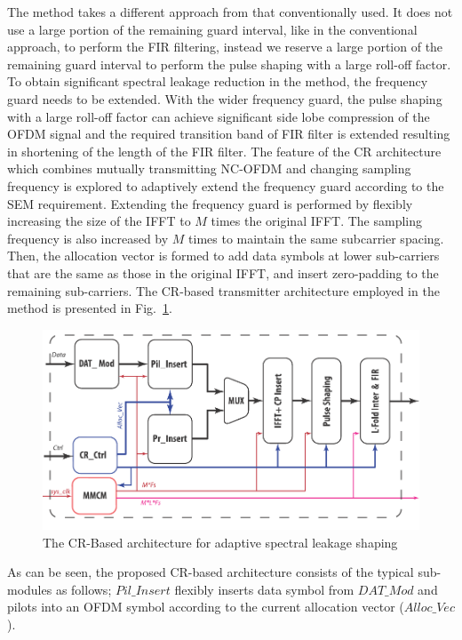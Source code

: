 The method takes a different approach from that conventionally used.
It does not use a large portion of the remaining guard interval, like in the conventional approach, to perform the FIR filtering, instead we reserve a large portion of the remaining guard interval to perform the pulse shaping with a large roll-off factor.
To obtain significant spectral leakage reduction in the method, the frequency guard needs to be extended. 
With the wider frequency guard, the pulse shaping with a large roll-off factor can achieve significant side lobe compression of the OFDM signal and the required transition band of FIR filter is extended resulting in shortening of the length of the FIR filter.
The feature of the CR architecture which combines mutually transmitting NC-OFDM and changing sampling frequency is explored to adaptively extend the frequency guard according to the SEM requirement. 
Extending the frequency guard is performed by flexibly increasing the size of the IFFT to $M$ times the original IFFT. The sampling frequency is also increased by $M$ times to maintain the same subcarrier spacing.
Then, the allocation vector is formed to add data symbols at lower sub-carriers that are the same as those in the original IFFT, and insert zero-padding to the remaining sub-carriers.
The CR-based transmitter  architecture employed in the method is presented in Fig.~\ref{fig:Struc}. 
\begin{figure}[t]
    \centerline{\includegraphics [width=1\columnwidth] {Figures/CRTx_shaping.pdf} }
	\vspace{-2mm}
    \caption{The CR-Based architecture for adaptive spectral leakage shaping}
    \label{fig:Struc}
\end{figure}
As can be seen, the proposed CR-based architecture consists of the typical sub-modules as follows;
$\mathit{Pil\_Insert}$ flexibly inserts data symbol from $\mathit{DAT\_Mod}$ and pilots into an OFDM symbol according to the current allocation vector ($\mathit{Alloc\_Vec}$).
